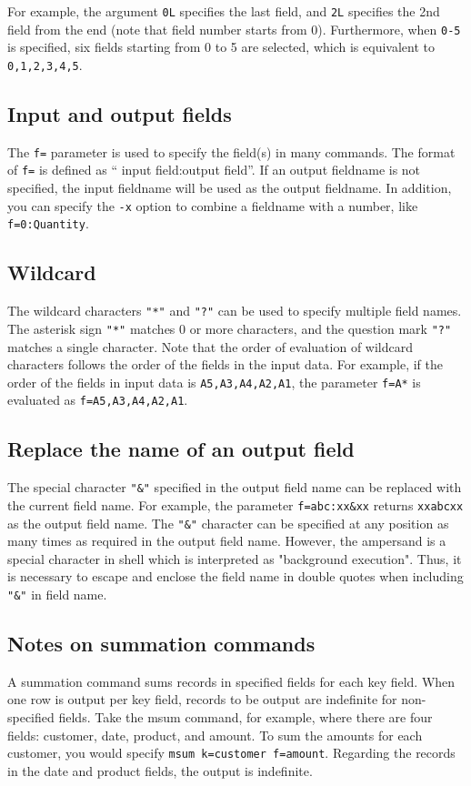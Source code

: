 For example, the argument \verb|0L| specifies the last field, and \verb|2L| specifies the 2nd field from the end (note that field number starts from 0). Furthermore, when \verb|0-5| is specified, six fields starting from 0 to 5 are selected, which is equivalent to \verb|0,1,2,3,4,5|.



\subsection{Input and output fields}
The \verb|f=| parameter is used to specify the field(s) in many commands. The format of \verb|f=| is defined as “ input field:output field”. If an output fieldname is not specified, the input fieldname will be used as the output fieldname. In addition, you can specify the \verb|-x| option to combine a fieldname with a number, like \verb|f=0:Quantity|.



\subsection{Wildcard}
The wildcard characters  \verb|"*"| and  \verb|"?"|  can be used to specify multiple field names.
The asterisk sign \verb|"*"| matches 0 or more characters, and the question mark \verb|"?"| matches a single character.
Note that the order of evaluation of wildcard characters follows the order of the fields in the input data.
For example, if the order of the fields in input data is \verb|A5,A3,A4,A2,A1|, the parameter \verb|f=A*| is evaluated as \verb|f=A5,A3,A4,A2,A1|.



\subsection{Replace the name of an output field}
The special character \verb|"&"| specified in the output field name can be replaced with the current field name.
For example, the parameter \verb|f=abc:xx&xx| returns \verb|xxabcxx| as the output field name.
The \verb|"&"| character can be specified at any position as many times as required in the output field name.
However, the ampersand is a special character in shell which is interpreted as "background execution". Thus, it is necessary to escape and enclose the field name in double quotes when including \verb|"&"| in field name.



\subsection{Notes on summation commands}
A summation command sums records in specified fields for each key field. When one row is output per key field, records to be output are indefinite for non-specified fields. Take the msum command, for example, where there are four fields: customer, date, product, and amount. To sum the amounts for each customer, you would specify \verb|msum k=customer f=amount|. Regarding the records in the date and product fields, the output is indefinite.
%
